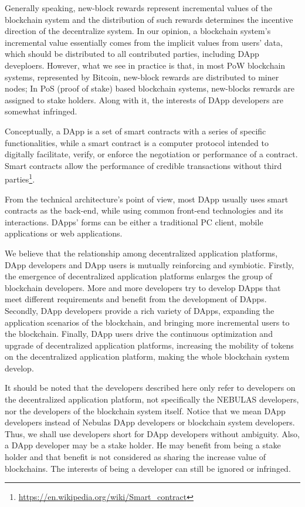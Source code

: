 Generally speaking,  new-block rewards represent incremental values of the blockchain system and the distribution of such rewards determines the incentive direction of the decentralize system. In our opinion, a blockchain system's incremental value essentially comes from the implicit values from users' data, which should be distributed to all contributed parties, including DApp deveploers. However, what we see in practice is that, in most PoW blockchain systems, represented by Bitcoin, new-block rewards are distributed to miner nodes; In PoS (proof of stake) based blockchain systems, new-blocks rewards are assigned to  stake holders. Along with it, the interests of DApp developers are somewhat infringed.


Conceptually, a DApp is a set of smart contracts with a series of specific
functionalities, while a smart contract is a computer protocol intended to
digitally facilitate, verify, or enforce the negotiation or performance of a
contract. Smart contracts allow the performance of credible transactions
without third
parties\footnote{\url{https://en.wikipedia.org/wiki/Smart\_contract}}.

From the technical architecture's point of view, most DApp usually uses smart contracts as the back-end, while using common front-end technologies and its interactions. DApps' forms can be either a traditional PC client, mobile applications or web applications.

We believe that the relationship among decentralized application platforms, DApp developers and DApp users is mutually reinforcing and symbiotic. Firstly, the emergence of decentralized application platforms enlarges the group of blockchain developers. More and more developers try to develop DApps that meet different requirements and benefit from the development of DApps. Secondly, DApp developers provide a rich variety of DApps, expanding the application scenarios of the blockchain, and bringing more incremental users to the blockchain. Finally, DApp users drive the continuous optimization and upgrade of decentralized application platforms, increasing the mobility of tokens on the decentralized application platform, making the whole blockchain system develop.

It should be noted that the developers described here only refer to developers on the decentralized application platform, not specifically the NEBULAS developers, nor the developers of the blockchain system itself.
Notice that we mean DApp developers instead of Nebulas DApp developers or
blockchain system developers. Thus, we shall use developers short for DApp
developers without ambiguity. Also, a DApp developer may be a stake holder.
He may benefit from being a stake holder and that benefit is not considered
as sharing the increase value of blockchains. The interests of being a developer can still be ignored or infringed.


